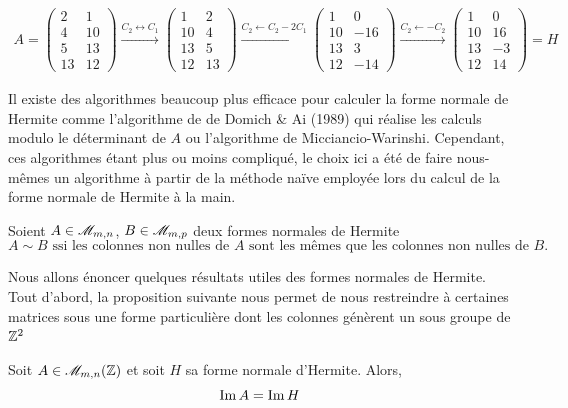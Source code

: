 \documentclass[12pt]{article}
\begin{document}
\begin{example}
	\begin{equation*}
		\begin{split}
			A =
			\begin{pmatrix}
				2  & 1  \\
				4  & 10 \\
				5  & 13 \\
				13 & 12
			\end{pmatrix}
			\overset{C_2 \leftrightarrow C_1}{\longrightarrow}
			\begin{pmatrix}
				1  & 2  \\
				10 & 4  \\
				13 & 5  \\
				12 & 13
			\end{pmatrix}
			\overset{C_2 \leftarrow C_2 - 2C_1}{\longrightarrow}
			\begin{pmatrix}
				1  & 0   \\
				10 & -16 \\
				13 & 3   \\
				12 & -14
			\end{pmatrix}
			\overset{C_2 \leftarrow - C_2}{\longrightarrow}
			\begin{pmatrix}
				1  & 0  \\
				10 & 16 \\
				13 & -3 \\
				12 & 14
			\end{pmatrix} = H
		\end{split}
	\end{equation*}

\end{example}
\begin{remark}
	Il existe des algorithmes beaucoup plus efficace pour calculer la forme normale de Hermite comme
	l'algorithme de de Domich \& Ai (1989) qui réalise les calculs modulo le déterminant de $A$ ou
	l'algorithme de Micciancio-Warinshi. Cependant, ces algorithmes étant plus ou moins compliqué,
	le choix ici a été de faire nous-mêmes un algorithme à partir de la méthode naïve employée
	lors du calcul de la forme normale de Hermite à la main.
\end{remark}

\newpage
\begin{definition}
	Soient $A \in \mathscr{M}_{m,n}$, $B \in \mathscr{M}_{m,p}$ deux formes normales de Hermite
	$$A \sim B \text{ ssi les colonnes non nulles de } A
		\text{ sont les mêmes que les colonnes non nulles de } B.$$
\end{definition}
Nous allons énoncer quelques résultats utiles des formes normales de Hermite.
Tout d'abord, la proposition suivante nous permet de nous restreindre à certaines matrices sous une forme particulière
dont les colonnes génèrent un sous groupe de $\mathbb Z^2$
\begin{proposition}\label{ima_imh}
	Soit $A \in \mathscr{M}_{m,n}(\mathbb Z)$ et soit $H$ sa forme normale d'Hermite. Alors,
	$$\operatorname{Im} A = \operatorname{Im} H$$
\end{proposition}
\end{document}
